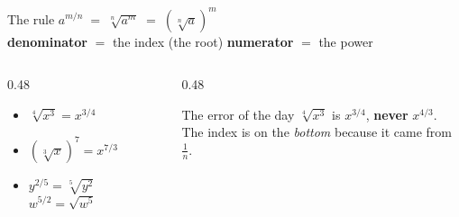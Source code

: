 \documentclass[aspectratio=169, 11pt]{beamer}
\begin{document}
\begin{frame}[t, plain]
  \begin{center}
    \begin{minipage}{0.86\textwidth}
      \begin{block}{The rule}
        \centering
        $\displaystyle a^{m/n} \;=\; \sqrt[n]{a^{m}} \;=\; \left(\sqrt[n]{a}\right)^{m}$ \\[4pt]
        {\footnotesize \textbf{denominator} $=$ the index (the root) \qquad
        \textbf{numerator} $=$ the power}
      \end{block}
    \end{minipage}
  \end{center}
  \vspace{4pt}
  \begin{columns}[T]
    \begin{column}{0.48\textwidth}
      \footnotesize
      \begin{itemize}\setlength{\itemsep}{4pt}
        \item $\sqrt[4]{x^{3}} = x^{3/4}$
        \item $\left(\sqrt[3]{x}\right)^{7} = x^{7/3}$
        \item $y^{2/5} = \sqrt[5]{y^{2}}$ \qquad $w^{5/2}=\sqrt{w^{5}}$
      \end{itemize}
    \end{column}
    \begin{column}{0.48\textwidth}
      \begin{block}{The error of the day}
        $\sqrt[4]{x^{3}}$ is $x^{3/4}$, \textbf{never} $x^{4/3}$. \\[3pt]
        {\footnotesize The index is on the \emph{bottom} because it came from $\frac{1}{n}$.}
      \end{block}
    \end{column}
  \end{columns}
\end{frame}
\end{document}
